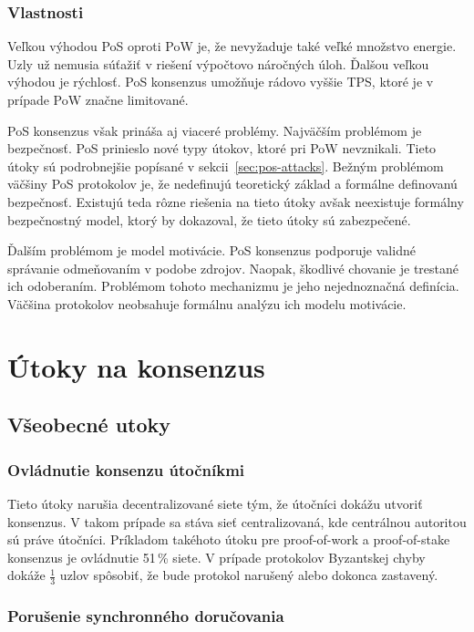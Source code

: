 \subsection{Vlastnosti}

Veľkou výhodou PoS oproti PoW je, že nevyžaduje také veľké množstvo energie. Uzly už nemusia súťažiť v riešení výpočtovo náročných úloh. Ďalšou veľkou výhodou je rýchlosť. PoS konsenzus umožňuje rádovo vyššie TPS, ktoré je v prípade PoW značne limitované.~\cite{leporeConsensus, nguyenPos}

PoS konsenzus však prináša aj viaceré problémy. Najväčším problémom je bezpečnosť. PoS prinieslo nové typy útokov, ktoré pri PoW nevznikali. Tieto útoky sú podrobnejšie popísané v sekcii~\ref{sec:pos-attacks}. Bežným problémom väčšiny PoS protokolov je, že nedefinujú teoretický základ a formálne definovanú bezpečnosť. Existujú teda rôzne riešenia na tieto útoky avšak neexistuje formálny bezpečnostný model, ktorý by dokazoval, že tieto útoky sú zabezpečené.

Ďalším problémom je model motivácie. PoS konsenzus podporuje validné správanie odmeňovaním v podobe zdrojov. Naopak, škodlivé chovanie je trestané ich odoberaním. Problémom tohoto mechanizmu je jeho nejednoznačná definícia. Väčšina protokolov neobsahuje formálnu analýzu ich modelu motivácie.~\cite{nguyenPos}

\chapter{Útoky na konsenzus}

\section{Všeobecné utoky}

\subsection{Ovládnutie konsenzu útočníkmi}
Tieto útoky narušia decentralizované siete tým, že útočníci dokážu utvoriť konsenzus. V takom prípade sa stáva sieť centralizovaná, kde centrálnou autoritou sú práve útočníci. Príkladom takéhoto útoku pre proof-of-work a proof-of-stake konsenzus je ovládnutie 51\,\% siete. V prípade protokolov Byzantskej chyby dokáže $\frac{1}{3}$ uzlov spôsobiť, že bude protokol narušený alebo dokonca zastavený.~\cite{homoliakBlockchain}

\subsection{Porušenie synchronného doručovania}

